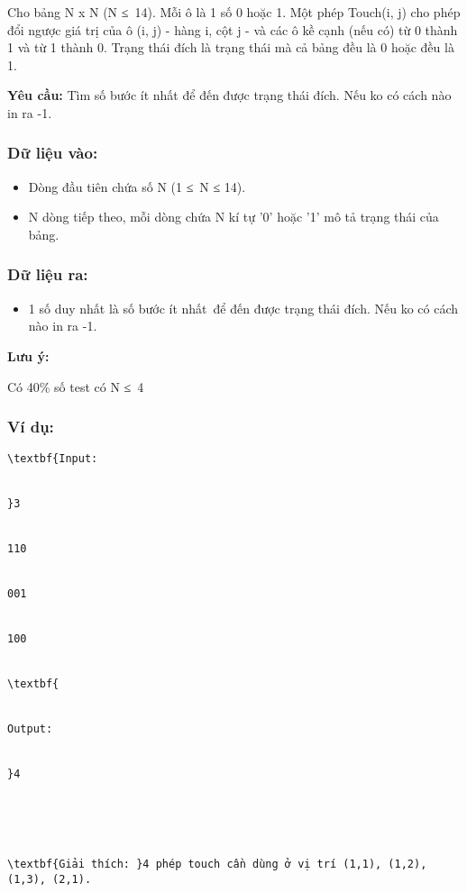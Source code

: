 



   Cho bảng N x N (N ≤ 14). Mỗi ô là 1 số 0 hoặc 1. Một phép Touch(i, j) cho phép đổi ngược giá trị của ô (i, j) - hàng i, cột j - và các ô kề cạnh (nếu có) từ 0 thành 1 và từ 1 thành 0. Trạng thái đích là trạng thái mà cả bảng đều là 0 hoặc đều là 1.  

\textbf{    Yêu cầu:   }   Tìm số bước ít nhất để đến được trạng thái đích. Nếu ko có cách nào in ra -1.  

\subsubsection{\textbf{    Dữ liệu vào:   }}
\begin{itemize}
	\item     Dòng đầu tiên chứa số N (1 ≤ N ≤ 14).   
	\item     N dòng tiếp theo, mỗi dòng chứa N kí tự '0' hoặc '1' mô tả trạng thái của bảng.   
\end{itemize}

\subsubsection{   Dữ liệu ra:  }
\begin{itemize}
	\item     1 số duy nhất là số bước ít nhất để đến được trạng thái đích. Nếu ko có cách nào in ra -1.   
\end{itemize}

\textbf{     Lưu ý:    }

    Có 40\% số test có N ≤ 4   

\subsubsection{   Ví dụ:  }
\begin{verbatim}
\textbf{Input:


}3


110 


001


100


\textbf{


Output:


}4





\textbf{Giải thích: }4 phép touch cần dùng ở vị trí (1,1), (1,2), (1,3), (2,1).


\end{verbatim}
